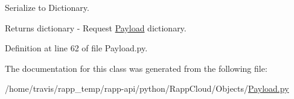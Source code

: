 Serialize to Dictionary. 

\begin{DoxyReturn}{Returns}
dictionary -\/ Request \hyperlink{classRappCloud_1_1Objects_1_1Payload_1_1Payload}{Payload} dictionary. 
\end{DoxyReturn}


Definition at line 62 of file Payload.\-py.



The documentation for this class was generated from the following file\-:\begin{DoxyCompactItemize}
\item 
/home/travis/rapp\-\_\-temp/rapp-\/api/python/\-Rapp\-Cloud/\-Objects/\hyperlink{Payload_8py}{Payload.\-py}\end{DoxyCompactItemize}

